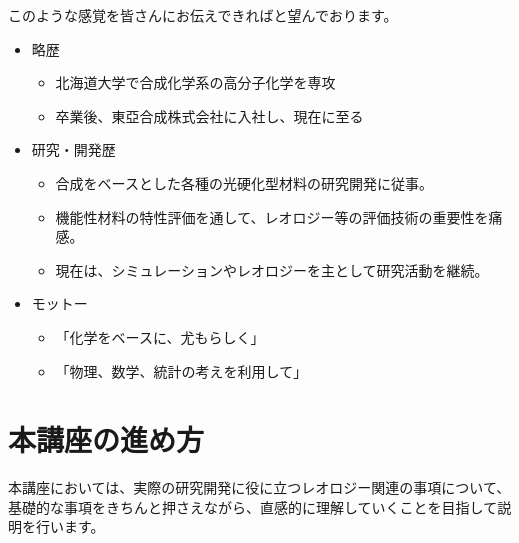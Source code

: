 \documentclass[uplatex,dvipdfmx,a4paper,11pt]{jsreport}
\begin{document}
このような感覚を皆さんにお伝えできればと望んでおります。

\begin{screen}
	\begin{itemize}
		\item 略歴
        \begin{itemize}
            \item 北海道大学で合成化学系の高分子化学を専攻
			\item 卒業後、東亞合成株式会社に入社し、現在に至る
		\end{itemize}
		\item  研究・開発歴
		\begin{itemize}
			\item 合成をベースとした各種の光硬化型材料の研究開発に従事。
			\item 機能性材料の特性評価を通して、レオロジー等の評価技術の重要性を痛感。
			\item 現在は、シミュレーションやレオロジーを主として研究活動を継続。
		\end{itemize}
		\item モットー
		\begin{itemize}
            \item 「化学をベースに、尤もらしく」
			\item 「物理、数学、統計の考えを利用して」
		\end{itemize}
	\end{itemize}
\end{screen}

\section*{本講座の進め方}

本講座においては、実際の研究開発に役に立つレオロジー関連の事項について、基礎的な事項をきちんと押さえながら、直感的に理解していくことを目指して説明を行います。
\end{document}
